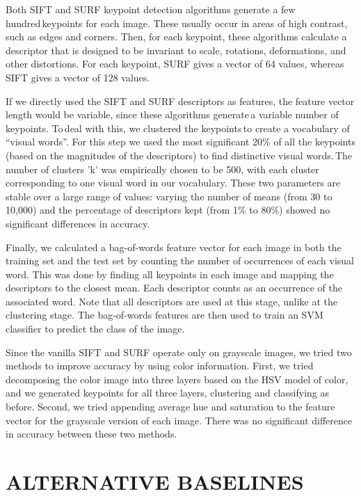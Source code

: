 \documentclass{article}
\begin{document}
Both SIFT and SURF keypoint detection algorithms generate a few hundred keypoints
for each image. These usually occur in areas of high contrast, such as edges and
corners. Then, for each keypoint, these algorithms calculate a descriptor that
is designed to be invariant to scale, rotations, deformations, and other distortions.
For each keypoint, SURF gives a vector of 64 values, whereas SIFT gives a vector
of 128 values.

If we directly used the SIFT and SURF descriptors as features, the feature vector
length would be variable, since these algorithms generate a variable number of
keypoints. To deal with this, we clustered the keypoints to create a vocabulary
of “visual words”. For this step we used the most significant 20\% of all the
keypoints (based on the magnitudes of the descriptors) to find distinctive 
visual words. The number of clusters 'k' was empirically chosen to be 500,
with each cluster corresponding to one visual word in our vocabulary. These two
parameters are stable over a large range of values: varying the number of means
(from 30 to 10,000) and the percentage of descriptors kept (from 1\% to 80\%) showed no
significant differences in accuracy.

Finally, we calculated a bag-of-words feature vector for each image in both the
training set and the test set by counting the number of occurrences of each
visual word. This was done by finding all keypoints in each image and mapping
the descriptors to the closest mean. Each descriptor counts as an occurrence of
the associated word. Note that all descriptors are used at this stage, unlike at
the clustering stage. The bag-of-words features are then used to train an SVM
classifier to predict the class of the image.

Since the vanilla SIFT and SURF operate only on grayscale images, we tried two
methods to improve accuracy by using color information. First, we tried
decomposing the color image into three layers based on the HSV model of color,
and we generated keypoints for all three layers, clustering and classifying as
before. Second, we tried appending average hue and saturation to the feature
vector for the grayscale version of each image. There was no significant difference
in accuracy between these two methods.

\section{ALTERNATIVE BASELINES}
\label{sec:alternative}
\end{document}
